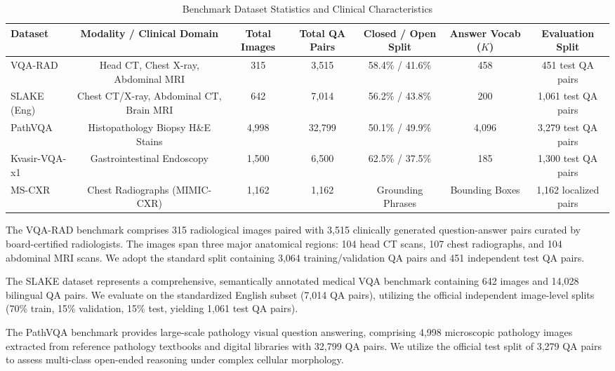 \documentclass[journal,twoside,web]{ieeecolor}
\begin{document}
\begin{table}[t]
\caption{Benchmark Dataset Statistics and Clinical Characteristics}
\label{tab:dataset_stats}
\centering
\setlength{\tabcolsep}{5pt}
\begin{tabular}{lcccccc}
\toprule
\textbf{Dataset} & \textbf{Modality / Clinical Domain} & \textbf{Total Images} & \textbf{Total QA Pairs} & \textbf{Closed / Open Split} & \textbf{Answer Vocab ($K$)} & \textbf{Evaluation Split} \\
\midrule
VQA-RAD \cite{lau2018} & Head CT, Chest X-ray, Abdominal MRI & 315 & 3,515 & 58.4\% / 41.6\% & 458 & 451 test QA pairs \\
SLAKE (Eng) \cite{liu2021} & Chest CT/X-ray, Abdominal CT, Brain MRI & 642 & 7,014 & 56.2\% / 43.8\% & 200 & 1,061 test QA pairs \\
PathVQA \cite{he2020pathvqa} & Histopathology Biopsy H\&E Stains & 4,998 & 32,799 & 50.1\% / 49.9\% & 4,096 & 3,279 test QA pairs \\
Kvasir-VQA-x1 \cite{jha2023} & Gastrointestinal Endoscopy & 1,500 & 6,500 & 62.5\% / 37.5\% & 185 & 1,300 test QA pairs \\
MS-CXR \cite{boecking2022} & Chest Radiographs (MIMIC-CXR) & 1,162 & 1,162 & Grounding Phrases & Bounding Boxes & 1,162 localized pairs \\
\bottomrule
\end{tabular}
\end{table}

The VQA-RAD benchmark \cite{lau2018} comprises 315 radiological images paired with 3,515 clinically generated question-answer pairs curated by board-certified radiologists. The images span three major anatomical regions: 104 head CT scans, 107 chest radiographs, and 104 abdominal MRI scans. We adopt the standard split containing 3,064 training/validation QA pairs and 451 independent test QA pairs.

The SLAKE dataset \cite{liu2021} represents a comprehensive, semantically annotated medical VQA benchmark containing 642 images and 14,028 bilingual QA pairs. We evaluate on the standardized English subset (7,014 QA pairs), utilizing the official independent image-level splits (70\% train, 15\% validation, 15\% test, yielding 1,061 test QA pairs).

The PathVQA benchmark \cite{he2020pathvqa} provides large-scale pathology visual question answering, comprising 4,998 microscopic pathology images extracted from reference pathology textbooks and digital libraries with 32,799 QA pairs. We utilize the official test split of 3,279 QA pairs to assess multi-class open-ended reasoning under complex cellular morphology.
\end{document}
